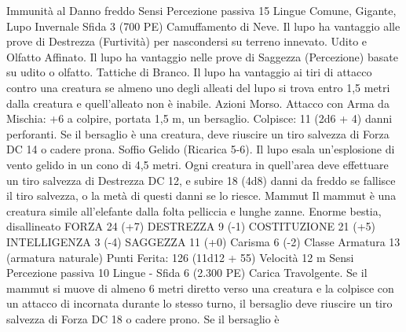 \begin{multicols}{2}
Immunità al Danno freddo
Sensi Percezione passiva 15
Lingue Comune, Gigante, Lupo Invernale
Sfida 3 (700 PE)
Camuffamento di Neve. Il lupo ha vantaggio alle prove di
Destrezza (Furtività) per nascondersi su terreno innevato.
Udito e Olfatto Affinato. Il lupo ha vantaggio nelle prove di
Saggezza (Percezione) basate su udito o olfatto.
Tattiche di Branco. Il lupo ha vantaggio ai tiri di attacco contro
una creatura se almeno uno degli alleati del lupo si trova entro
1,5 metri dalla creatura e quell’alleato non è inabile.
Azioni
Morso. Attacco con Arma da Mischia: +6 a colpire, portata 1,5
m, un bersaglio.
Colpisce: 11 (2d6 + 4) danni perforanti. Se il bersaglio è una
creatura, deve riuscire un tiro salvezza di Forza DC 14 o cadere
prona.
Soffio Gelido (Ricarica 5-6). Il lupo esala un’esplosione di vento
gelido in un cono di 4,5 metri. Ogni creatura in quell’area deve
effettuare un tiro salvezza di Destrezza DC 12, e subire 18 (4d8)
danni da freddo se fallisce il tiro salvezza, o la metà di questi
danni se lo riesce.
Mammut
Il mammut è una creatura simile all’elefante dalla folta
pelliccia e lunghe zanne.
Enorme bestia, disallineato
FORZA 24 (+7)
DESTREZZA 9 (-1)
COSTITUZIONE 21 (+5)
INTELLIGENZA 3 (-4)
SAGGEZZA 11 (+0)
Carisma 6 (-2)
Classe Armatura 13 (armatura naturale)
\hspace*{0pt}\hfill{Punti Ferita}: 126 (11d12 + 55)
Velocità 12 m
Sensi Percezione passiva 10
Lingue -
Sfida 6 (2.300 PE)
Carica Travolgente. Se il mammut si muove di almeno 6 metri
diretto verso una creatura e la colpisce con un attacco di
incornata durante lo stesso turno, il bersaglio deve riuscire un
tiro salvezza di Forza DC 18 o cadere prono. Se il bersaglio è 
 

\end{multicols}
